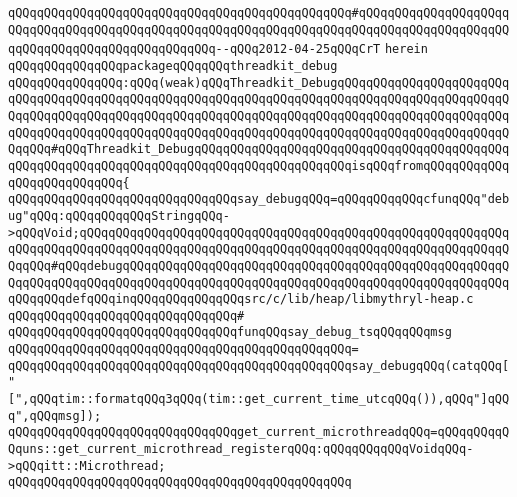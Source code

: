 \verb|qQQqqQQqqQQqqQQqqQQqqQQqqQQqqQQqqQQqqQQqqQQqqQQq#qQQqqQQqqQQqqQQqqQQqqQQqqQQqqQQqqQQqqQQqqQQqqQQqqQQqqQQqqQQqqQQqqQQqqQQqqQQqqQQqqQQqqQQqqQQqqQQqqQQqqQQqqQQqqQQqqQQqqQQq--qQQq2012-04-25qQQqCrT|\newline
\verb|herein|\newline
\newline
\verb|qQQqqQQqqQQqqQQqpackageqQQqqQQqthreadkit_debug|\newline
\verb|qQQqqQQqqQQqqQQq:qQQq(weak)qQQqThreadkit_DebugqQQqqQQqqQQqqQQqqQQqqQQqqQQqqQQqqQQqqQQqqQQqqQQqqQQqqQQqqQQqqQQqqQQqqQQqqQQqqQQqqQQqqQQqqQQqqQQqqQQqqQQqqQQqqQQqqQQqqQQqqQQqqQQqqQQqqQQqqQQqqQQqqQQqqQQqqQQqqQQqqQQqqQQqqQQqqQQqqQQqqQQqqQQqqQQqqQQqqQQqqQQqqQQqqQQqqQQqqQQqqQQqqQQqqQQqqQQqqQQq#qQQqThreadkit_DebugqQQqqQQqqQQqqQQqqQQqqQQqqQQqqQQqqQQqqQQqqQQqqQQqqQQqqQQqqQQqqQQqqQQqqQQqqQQqqQQqqQQqqQQqqQQqisqQQqfromqQQqqQQqqQQq|\newline
\verb|qQQqqQQqqQQqqQQq{|\newline
\verb|qQQqqQQqqQQqqQQqqQQqqQQqqQQqqQQqsay_debugqQQq=qQQqqQQqqQQqcfunqQQq"debug"qQQq:qQQqqQQqqQQqStringqQQq->qQQqVoid;qQQqqQQqqQQqqQQqqQQqqQQqqQQqqQQqqQQqqQQqqQQqqQQqqQQqqQQqqQQqqQQqqQQqqQQqqQQqqQQqqQQqqQQqqQQqqQQqqQQqqQQqqQQqqQQqqQQqqQQqqQQqqQQqqQQqqQQq#qQQqdebugqQQqqQQqqQQqqQQqqQQqqQQqqQQqqQQqqQQqqQQqqQQqqQQqqQQqqQQqqQQqqQQqqQQqqQQqqQQqqQQqqQQqqQQqqQQqqQQqqQQqqQQqqQQqqQQqqQQqqQQqqQQqqQQqqQQqdefqQQqinqQQqqQQqqQQqqQQqsrc/c/lib/heap/libmythryl-heap.c|\newline
\verb|qQQqqQQqqQQqqQQqqQQqqQQqqQQqqQQq#|\newline
\verb|qQQqqQQqqQQqqQQqqQQqqQQqqQQqqQQqfunqQQqsay_debug_tsqQQqqQQqmsg|\newline
\verb|qQQqqQQqqQQqqQQqqQQqqQQqqQQqqQQqqQQqqQQqqQQqqQQq=|\newline
\verb|qQQqqQQqqQQqqQQqqQQqqQQqqQQqqQQqqQQqqQQqqQQqqQQqsay_debugqQQq(catqQQq["[",qQQqtim::formatqQQq3qQQq(tim::get_current_time_utcqQQq()),qQQq"]qQQq",qQQqmsg]);|\newline
\newline
\verb|qQQqqQQqqQQqqQQqqQQqqQQqqQQqqQQqget_current_microthreadqQQq=qQQqqQQqqQQquns::get_current_microthread_registerqQQq:qQQqqQQqqQQqVoidqQQq->qQQqitt::Microthread;|\newline
\verb|qQQqqQQqqQQqqQQqqQQqqQQqqQQqqQQqqQQqqQQqqQQqqQQq|\newline
\newline

